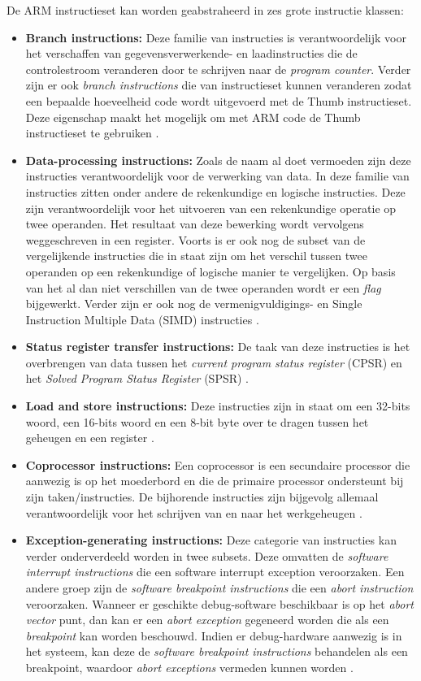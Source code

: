 De ARM instructieset kan worden geabstraheerd in zes grote instructie klassen:
\begin{itemize}
    \item \textbf{Branch instructions:} Deze familie van instructies is verantwoordelijk voor het verschaffen van gegevensverwerkende- en laadinstructies die de controlestroom veranderen door te schrijven naar de \textit{program counter}. Verder zijn er ook \textit{branch instructions} die van instructieset kunnen veranderen zodat een bepaalde hoeveelheid code wordt uitgevoerd met de Thumb instructieset. Deze eigenschap maakt het mogelijk om met ARM code de Thumb instructieset te gebruiken \autocite{Seal2000}.
    \item \textbf{Data-processing instructions:} Zoals de naam al doet vermoeden zijn deze instructies verantwoordelijk voor de verwerking van data. In deze familie van instructies zitten onder andere de rekenkundige en logische instructies. Deze zijn verantwoordelijk voor het uitvoeren van een rekenkundige operatie op twee operanden. Het resultaat van deze bewerking wordt vervolgens weggeschreven in een register. Voorts is er ook nog de subset van de vergelijkende instructies die in staat zijn om het verschil tussen twee operanden op een rekenkundige of logische manier te vergelijken. Op basis van het al dan niet verschillen van de twee operanden wordt er een \textit{flag} bijgewerkt. Verder zijn er ook nog de vermenigvuldigings- en Single Instruction Multiple Data (SIMD) instructies \autocite{Seal2000}.
    \item \textbf{Status register transfer instructions:} De taak van deze instructies is het overbrengen van data tussen het \textit{current program status register} (CPSR) en het \textit{Solved Program Status Register} (SPSR) \autocite{ARM2022c}.
    \item \textbf{Load and store instructions:} Deze instructies zijn in staat om een 32-bits woord, een 16-bits woord en een 8-bit byte over te dragen tussen het geheugen en een register \autocite{ARM2022c}.
    \item \textbf{Coprocessor instructions:} Een coprocessor is een secundaire processor die aanwezig is op het moederbord en die de primaire processor ondersteunt bij zijn taken/instructies. De bijhorende instructies zijn bijgevolg allemaal verantwoordelijk voor het schrijven van en naar het werkgeheugen \autocite{ARM2022c}.
    \item \textbf{Exception-generating instructions:} Deze categorie van instructies kan verder onderverdeeld worden in twee subsets. Deze omvatten de \textit{software interrupt instructions} die een software interrupt exception veroorzaken. Een andere groep zijn de \textit{software breakpoint instructions} die een \textit{abort instruction} veroorzaken. Wanneer er geschikte debug-software beschikbaar is op het \textit{abort vector} punt, dan kan er een \textit{abort exception} gegeneerd worden die als een \textit{breakpoint} kan worden beschouwd. Indien er debug-hardware aanwezig is in het systeem, kan deze de \textit{software breakpoint instructions} behandelen als een breakpoint, waardoor \textit{abort exceptions} vermeden kunnen worden \autocite{Seal2000}.
\end{itemize}

